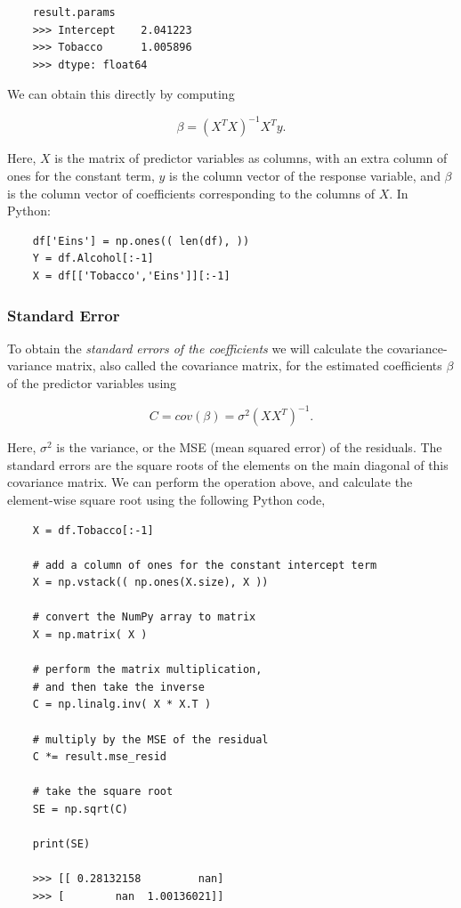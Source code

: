 \begin{lstlisting}
    result.params
    >>> Intercept    2.041223
    >>> Tobacco      1.005896
    >>> dtype: float64
\end{lstlisting}

We can obtain this directly by computing

\begin{equation}
    \beta = (X^{T}X)^{-1}X^{T}y.
\end{equation}

Here, $X$ is the matrix of predictor variables as columns, with an extra column of ones for the constant term, $y$ is the column vector of the response variable, and $\beta$ is the column vector of coefficients corresponding to the columns of $X$. In Python:

\begin{lstlisting}
    df['Eins'] = np.ones(( len(df), ))
    Y = df.Alcohol[:-1]
    X = df[['Tobacco','Eins']][:-1]
\end{lstlisting}


\subsubsection{Standard Error}

To obtain the \emph{standard errors of the coefficients} we will calculate the covariance-variance matrix, also called the covariance matrix, for the estimated coefficients $\beta$ of the predictor variables using

\begin{equation}
    C = cov(\beta) = \sigma^{2} ( X X^{T} )^{-1}.
\end{equation}

Here, $\sigma^{2}$ is the variance, or the MSE (mean squared error) of the residuals. The standard errors are the square roots of the elements on the main diagonal of this covariance matrix. We can perform the operation above, and calculate the element-wise square root using the following Python code,

\begin{lstlisting}
    X = df.Tobacco[:-1]

    # add a column of ones for the constant intercept term
    X = np.vstack(( np.ones(X.size), X ))

    # convert the NumPy array to matrix
    X = np.matrix( X )

    # perform the matrix multiplication,
    # and then take the inverse
    C = np.linalg.inv( X * X.T )

    # multiply by the MSE of the residual
    C *= result.mse_resid

    # take the square root
    SE = np.sqrt(C)

    print(SE)

    >>> [[ 0.28132158         nan]
    >>> [        nan  1.00136021]]

\end{lstlisting}

